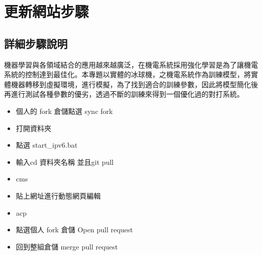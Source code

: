 \chapter{更新網站步驟}
\renewcommand{\baselinestretch}{10.0} %
\setcounter{page}{1}  %
\fontsize{14pt}{2.5pt}\sectionef
\section{詳細步驟說明}
機器學習與各領域結合的應用越來越廣泛，在機電系統採用強化學習是為了讓機電系統的控制達到最佳化。本專題以實體的冰球機，之機電系統作為訓練模型，將實體機器轉移到虛擬環境，進行模擬，為了找到適合的訓練參數，因此將模型簡化後再進行測試各種參數的優劣，透過不斷的訓練來得到一個優化過的對打系統。\\
\begin{itemize}
\item 個人的 fork 倉儲點選 sync fork 
\item 打開資料夾 
\item 點選 start_ipv6.bat 
\item 輸入cd 資料夾名稱 並且git pull 
\item cms 
\item 貼上網址進行動態網頁編輯 
\item acp 
\item 點選個人 fork 倉儲 Open pull request 
\item 回到整組倉儲 merge pull request
\end{itemize}
